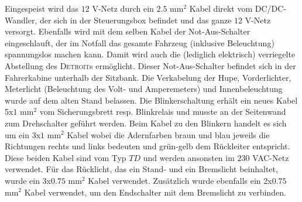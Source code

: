 Eingespeist wird das $12$ V-Netz durch ein $2.5$ mm$^2$ Kabel direkt vom DC/DC-Wandler, der sich in der Steuerungsbox befindet und das ganze $12$ V-Netz versorgt. Ebenfalls wird mit dem selben Kabel der Not-Aus-Schalter eingeschlauft, der im Notfall das gesamte Fahrzeug (inklusive Beleuchtung) spannungslos machen kann. Damit wird auch die (lediglich elektrisch) verriegelte Abstellung des \textsc{Detroit}s ermöglicht. Dieser Not-Aus-Schalter befindet sich in der Fahrerkabine unterhalb der Sitzbank. Die Verkabelung der Hupe, Vorderlichter, Meterlicht (Beleuchtung des Volt- und Amperemeters) und Innenbeleuchtung wurde auf dem alten Stand belassen. Die Blinkerschaltung erhält ein neues Kabel 5x$1$ mm$^2$ vom Sicherungsbrett resp. Blinkrelais und musste an der Seitenwand zum Drehschalter geführt werden. Beim Kabel zu den Blinkern handelt es sich um ein 3x$1$ mm$^2$ Kabel wobei die Adernfarben braun und blau jeweils die Richtungen rechts und links bedeuten und grün-gelb dem Rückleiter entspricht. Diese beiden Kabel sind vom Typ $TD$ und werden ansonsten im $230$ VAC-Netz verwendet. Für das Rücklicht, das ein Stand- und ein Bremslicht beinhaltet, wurde ein 3x$0.75$ mm$^2$ Kabel verwendet. Zusätzlich wurde ebenfalls ein 2x$0.75$ mm$^2$ Kabel verwendet, um den Endschalter mit dem Bremslicht zu verbinden.

\color{black}